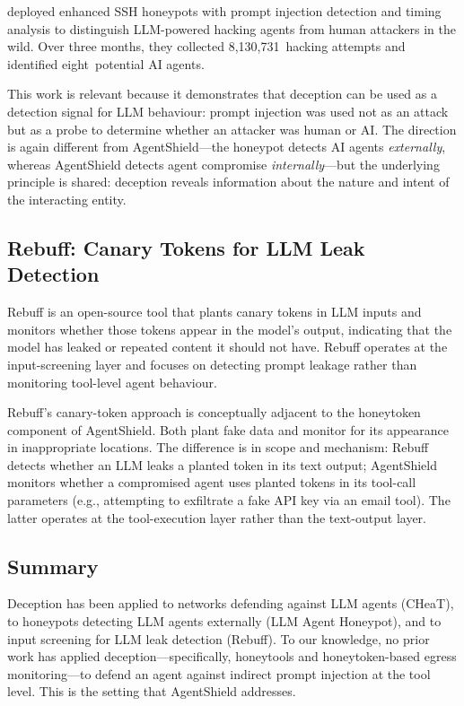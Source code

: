 \textcite{reworr2024llm} deployed enhanced SSH honeypots with prompt injection detection and timing analysis to distinguish LLM-powered hacking agents from human attackers in the wild.  Over three months, they collected 8,130,731~hacking attempts and identified eight~potential AI agents.

This work is relevant because it demonstrates that deception can be used as a detection signal for LLM behaviour: prompt injection was used not as an attack but as a probe to determine whether an attacker was human or AI.  The direction is again different from AgentShield---the honeypot detects AI agents \emph{externally}, whereas AgentShield detects agent compromise \emph{internally}---but the underlying principle is shared: deception reveals information about the nature and intent of the interacting entity.

\subsection{Rebuff: Canary Tokens for LLM Leak Detection}

Rebuff \parencite{protectai2023rebuff} is an open-source tool that plants canary tokens in LLM inputs and monitors whether those tokens appear in the model's output, indicating that the model has leaked or repeated content it should not have.  Rebuff operates at the input-screening layer and focuses on detecting prompt leakage rather than monitoring tool-level agent behaviour.

Rebuff's canary-token approach is conceptually adjacent to the honeytoken component of AgentShield.  Both plant fake data and monitor for its appearance in inappropriate locations.  The difference is in scope and mechanism: Rebuff detects whether an LLM leaks a planted token in its text output; AgentShield monitors whether a compromised agent uses planted tokens in its tool-call parameters (e.g., attempting to exfiltrate a fake API key via an email tool).  The latter operates at the tool-execution layer rather than the text-output layer.

\subsection{Summary}

Deception has been applied to networks defending against LLM agents (CHeaT), to honeypots detecting LLM agents externally (LLM Agent Honeypot), and to input screening for LLM leak detection (Rebuff).  To our knowledge, no prior work has applied deception---specifically, honeytools and honeytoken-based egress monitoring---to defend an agent against indirect prompt injection at the tool level.  This is the setting that AgentShield addresses.


